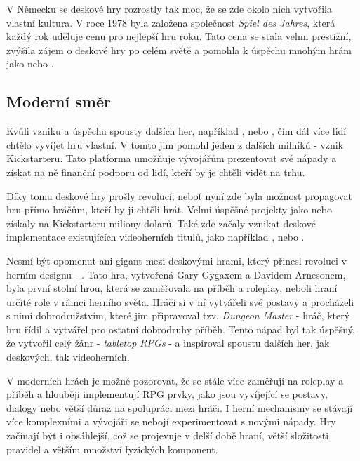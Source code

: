V Německu se deskové hry rozrostly tak moc, že se zde okolo nich vytvořila vlastní kultura. V roce 1978 byla založena společnost \textit{Spiel des Jahres}, která každý rok uděluje cenu pro nejlepší hru roku. Tato cena se stala velmi prestižní, zvýšila zájem o deskové hry po celém světě a pomohla k úspěchu mnohým hrám jako  nebo . \cite{attia_2018}

\subsection{Moderní směr}
\label{subsec:modern}

Kvůli vzniku a úspěchu spousty dalších her, například ,  nebo , čím dál více lidí chtělo vyvíjet hru vlastní. V tomto jim pomohl jeden z dalších milníků - vznik Kickstarteru. Tato platforma umožňuje vývojářům prezentovat své nápady a získat na ně finanční podporu od lidí, kteří by je chtěli vidět na trhu. \cite{attia_2018}

Díky tomu deskové hry prošly revolucí, neboť nyní zde byla možnost propagovat hru přímo hráčům, kteří by ji chtěli hrát. Velmi úspěšné projekty jako  nebo  získaly na Kickstarteru miliony dolarů. Také zde začaly vznikat deskové implementace existujících videoherních titulů, jako například ,  nebo . \cite{kickstarter}

Nesmí být opomenut ani gigant mezi deskovými hrami, který přinesl revoluci v herním designu - \textbf{}. Tato hra, vytvořená Gary Gygaxem a Davidem Arnesonem, byla první stolní hrou, která se zaměřovala na příběh a roleplay, neboli hraní určité role v rámci herního světa. Hráči si v ní vytvářeli své postavy a procházeli s nimi dobrodružstvím, které jim připravoval tzv. \textit{Dungeon Master} - hráč, který hru řídil a vytvářel pro ostatní dobrodruhy příběh. Tento nápad byl tak úspěšný, že vytvořil celý žánr - \textit{tabletop RPGs} - a inspiroval spoustu dalších her, jak deskových, tak videoherních. \cite{dnd_beyond_2023}

V moderních hrách je možné pozorovat, že se stále více zaměřují na roleplay a příběh a hlouběji implementují RPG prvky, jako jsou vyvíjející se postavy, dialogy nebo větší důraz na spolupráci mezi hráči. I herní mechanismy se stávají více komplexními a vývojáři se nebojí experimentovat s novými nápady. Hry začínají být i obsáhlejší, což se projevuje v delší době hraní, větší složitosti pravidel a větším množství fyzických komponent.


